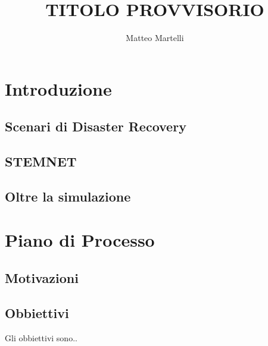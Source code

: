 \documentclass[a4paper,11pt]{report}
\title{TITOLO PROVVISORIO}
\author{Matteo Martelli}
\begin{document}
\maketitle
\tableofcontents

\begin{abstract}
\end{abstract}

\chapter{Introduzione}

\section{Scenari di Disaster Recovery}

\section{STEMNET}

\section{Oltre la simulazione}

\chapter{Piano di Processo}

\section{Motivazioni}

\section{Obbiettivi}
Gli obbiettivi sono..
\end{document}
